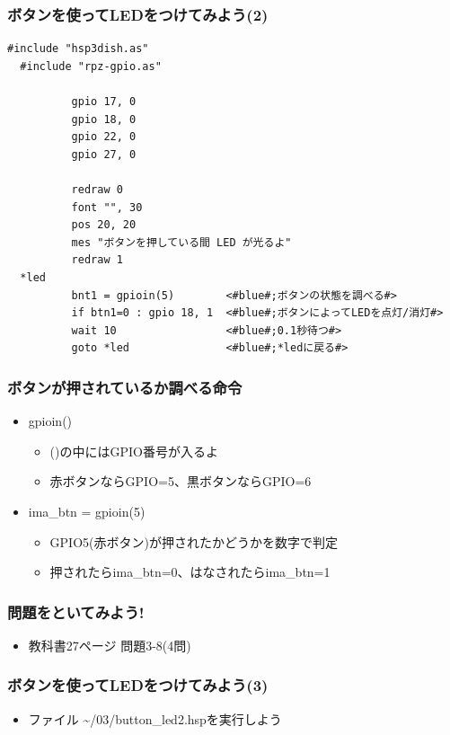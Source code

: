 \begin{frame}[fragile]
  \frametitle{ボタンを使ってLEDをつけてみよう(2)}
  \begin{lstlisting}[title=button\_led.hsp, label=button_led.hsp]
  #include "hsp3dish.as"
  #include "rpz-gpio.as"
  
          gpio 17, 0
          gpio 18, 0
          gpio 22, 0
          gpio 27, 0

          redraw 0
          font "", 30
          pos 20, 20
          mes "ボタンを押している間 LED が光るよ"
          redraw 1
  *led
          bnt1 = gpioin(5)        <#blue#;ボタンの状態を調べる#>
          if btn1=0 : gpio 18, 1  <#blue#;ボタンによってLEDを点灯/消灯#>
          wait 10                 <#blue#;0.1秒待つ#>
          goto *led               <#blue#;*ledに戻る#>
  \end{lstlisting}
\end{frame}

\begin{frame}
  \frametitle{ボタンが押されているか調べる命令}
  \begin{itemize}
    \item gpioin()
          \begin{itemize}
            \item ()の中にはGPIO番号が入るよ
            \item 赤ボタンならGPIO=5、黒ボタンならGPIO=6
          \end{itemize}
    \item ima\_btn = gpioin(5)
          \begin{itemize}
            \item GPIO5(赤ボタン)が押されたかどうかを数字で判定
            \item 押されたらima\_btn=0、はなされたらima\_btn=1
          \end{itemize}
  \end{itemize}
\end{frame}

\begin{frame}
  \frametitle{問題をといてみよう!}
  \begin{itemize}
    \item 教科書27ページ 問題3-8(4問)
  \end{itemize}
\end{frame}

\begin{frame}
  \frametitle{ボタンを使ってLEDをつけてみよう(3)}
  \begin{itemize}
    \item ファイル \rightarrow \sim/03/button\_led2.hspを実行しよう
  \end{itemize}
\end{frame}


